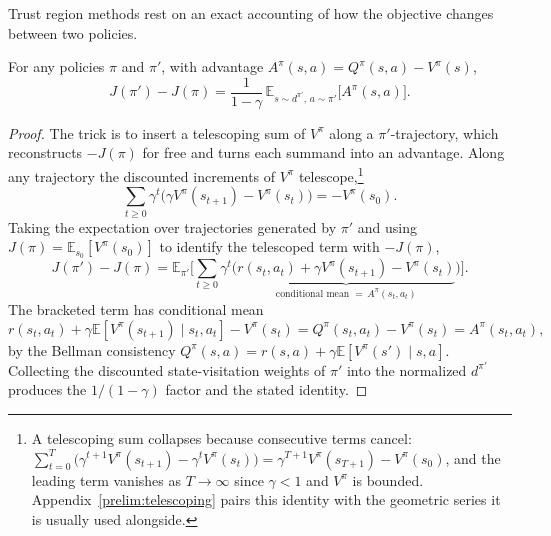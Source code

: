 Trust region methods rest on an exact accounting of how the objective changes between two policies.

\begin{lemma}
\label{lem:pdl}
For any policies $\pi$ and $\pi'$, with advantage $A^\pi(s,a) = Q^\pi(s,a) - V^\pi(s)$,
\[
J(\pi') - J(\pi) = \frac{1}{1-\gamma}\, \mathbb{E}_{s \sim d^{\pi'},\, a \sim \pi'}\big[ A^\pi(s,a) \big].
\]
\end{lemma}

\begin{proof}
The trick is to insert a telescoping sum of $V^\pi$ along a $\pi'$-trajectory, which reconstructs $-J(\pi)$ for free and turns each summand into an advantage. Along any trajectory the discounted increments of $V^\pi$ telescope,\footnote{A telescoping sum collapses because consecutive terms cancel: $\sum_{t=0}^{T} \big(\gamma^{t+1} V^\pi(s_{t+1}) - \gamma^t V^\pi(s_t)\big) = \gamma^{T+1} V^\pi(s_{T+1}) - V^\pi(s_0)$, and the leading term vanishes as $T \to \infty$ since $\gamma < 1$ and $V^\pi$ is bounded. Appendix~\ref{prelim:telescoping} pairs this identity with the geometric series it is usually used alongside.}
\[
\sum_{t \geq 0} \gamma^t \big(\gamma V^\pi(s_{t+1}) - V^\pi(s_t)\big) = -V^\pi(s_0).
\]
Taking the expectation over trajectories generated by $\pi'$ and using $J(\pi) = \mathbb{E}_{s_0}[V^\pi(s_0)]$ to identify the telescoped term with $-J(\pi)$,
\[
J(\pi') - J(\pi) = \mathbb{E}_{\pi'}\Big[ \sum_{t \geq 0} \gamma^t \big( \underbrace{r(s_t,a_t) + \gamma V^\pi(s_{t+1}) - V^\pi(s_t)}_{\text{conditional mean }=\, A^\pi(s_t,a_t)} \big) \Big].
\]
The bracketed term has conditional mean
\[
r(s_t,a_t) + \gamma \mathbb{E}[V^\pi(s_{t+1}) \mid s_t, a_t] - V^\pi(s_t) = Q^\pi(s_t,a_t) - V^\pi(s_t) = A^\pi(s_t,a_t),
\]
by the Bellman consistency $Q^\pi(s,a) = r(s,a) + \gamma \mathbb{E}[V^\pi(s') \mid s,a]$. Collecting the discounted state-visitation weights of $\pi'$ into the normalized $d^{\pi'}$ produces the $1/(1-\gamma)$ factor and the stated identity.
\end{proof}

